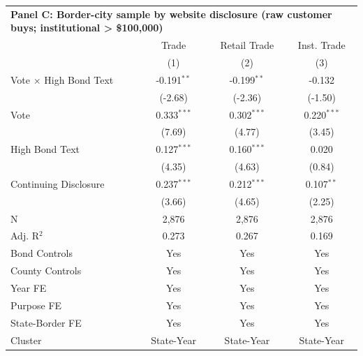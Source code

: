 \begingroup
\centering
\begin{tabular*}{\textwidth}{@{\extracolsep{\fill}}lccc}
\multicolumn{5}{l}{\textbf{Panel C: Border-city sample by website disclosure (raw customer buys; institutional > \$100,000)}}\\

\addlinespace
   \toprule
                                 & Trade         & Retail Trade  & Inst. Trade\\  
                                 & (1)           & (2)           & (3)\\  
   \midrule 
   Vote $\times$ High Bond Text  & -0.191$^{**}$ & -0.199$^{**}$ & -0.132\\   
                                 & (-2.68)      & (-2.36)      & (-1.50)\\   
   Vote                          & 0.333$^{***}$ & 0.302$^{***}$ & 0.220$^{***}$\\   
                                 & (7.69)       & (4.77)       & (3.45)\\   
   High Bond Text                & 0.127$^{***}$ & 0.160$^{***}$ & 0.020\\   
                                 & (4.35)       & (4.63)       & (0.84)\\   
   Continuing Disclosure         & 0.237$^{***}$ & 0.212$^{***}$ & 0.107$^{**}$\\   
                                 & (3.66)       & (4.65)       & (2.25)\\   
   \hline
   N                  & 2,876         & 2,876         & 2,876\\  
   Adj. R$^2$                & 0.273         & 0.267         & 0.169\\  
   Bond Controls                 & Yes           & Yes           & Yes\\  
   County Controls               & Yes           & Yes           & Yes\\  
   Year FE                       & Yes           & Yes           & Yes\\  
   Purpose FE                    & Yes           & Yes           & Yes\\  
   State-Border FE               & Yes           & Yes           & Yes\\  
   Cluster              & State-Year & State-Year & State-Year\\  
   \bottomrule
\end{tabular*}
\par\endgroup
